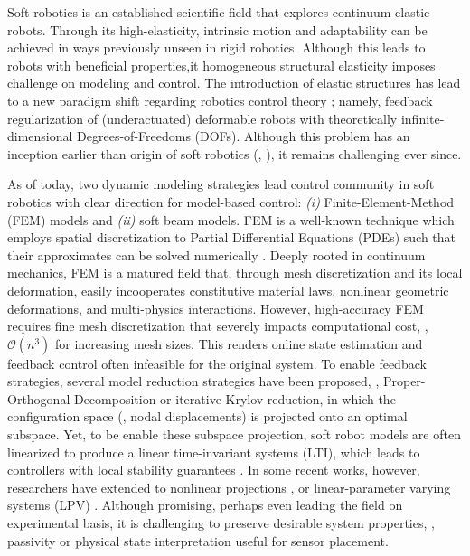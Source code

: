 Soft robotics is an established scientific field that explores continuum elastic robots. Through its high-elasticity, intrinsic motion and adaptability can be achieved in ways previously unseen in rigid robotics. Although this leads to robots with beneficial properties,it homogeneous structural elasticity imposes challenge on modeling and control. The introduction of elastic structures has lead to a new paradigm shift regarding robotics control theory \cite{DellaSantina2021}; namely, feedback regularization of (underactuated) deformable robots with theoretically infinite-dimensional Degrees-of-Freedoms (DOFs). Although this problem has an inception earlier than origin of soft robotics (\eg, \cite{Chirikjian1991,DeLuca2016Jul}), it remains challenging ever since.

As of today, two dynamic modeling strategies lead control community in soft robotics with clear direction for model-based control: \textit{(i)} Finite-Element-Method (FEM) models and \textit{(ii)} soft beam models. FEM is a well-known technique which employs spatial discretization to Partial Differential Equations (PDEs) such that their approximates can be solved numerically \cite{Bonet2016,Holzapfel2002,Kim2018}. Deeply rooted in continuum mechanics, FEM is a matured field that, through mesh discretization and its local deformation, easily incooperates constitutive material laws, nonlinear geometric deformations, and multi-physics interactions. However, high-accuracy FEM requires fine mesh discretization that severely impacts computational cost, \ie, $\mathcal{O}(n^3)$ for increasing mesh sizes. This renders online state estimation and feedback control often infeasible for the original system. To enable feedback strategies, several model reduction strategies have been proposed, \eg, Proper-Orthogonal-Decomposition \cite{Coevoet2017,Duriez2013,Goury2018,Thieffry2017} or iterative Krylov reduction, in which the configuration space (\ie, nodal displacements) is projected onto an optimal subspace. Yet, to be enable these subspace projection, soft robot models are often linearized to produce a linear time-invariant systems (LTI), which leads to controllers with local stability guarantees \cite{Thieffry2017,Goury2018,Katzschmann2019}. In some recent works, however, researchers have extended to nonlinear projections \cite{Chenevier2018}, or linear-parameter varying systems (LPV) \cite{Thieffry2020}. Although promising, perhaps even leading the field on experimental basis, it is challenging to preserve desirable system properties, \eg, passivity or physical state interpretation useful for sensor placement.

